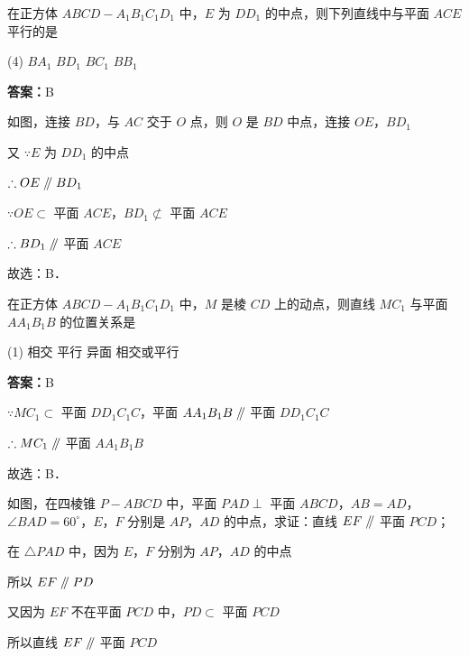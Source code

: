 \begin{example}[\bkstar{1}{5}]
在正方体 $ABCD-A_1B_1C_1D_1$ 中，$E$ 为 $DD_1$ 的中点，则下列直线中与平面 $ACE$ 平行的是
\begin{tasks}(4)
    \task $BA_1$
    \task $BD_1$
    \task $BC_1$
    \task $BB_1$
\end{tasks}
\end{example}
\begin{solution}
\textbf{答案：}B

如图，连接 $BD$，与 $AC$ 交于 $O$ 点，则 $O$ 是 $BD$ 中点，连接 $OE$，$BD_1$

又 $\because E$ 为 $DD_1$ 的中点

$\therefore OE\mathrel{/\mkern-5mu/} BD_1$

$\because OE\subset$ 平面 $ACE$，$BD_1\not\subset$ 平面 $ACE$

$\therefore BD_1\mathrel{/\mkern-5mu/}$ 平面 $ACE$

故选：B．
\end{solution}

\vspace{2em}

\begin{example}[\bkstar{1}{5}]
在正方体 $ABCD-A_1B_1C_1D_1$ 中，$M$ 是棱 $CD$ 上的动点，则直线 $MC_1$ 与平面 $AA_1B_1B$ 的位置关系是
\begin{tasks}(1)
    \task 相交
    \task 平行
    \task 异面
    \task 相交或平行
\end{tasks}
\end{example}
\begin{solution}
\textbf{答案：}B

$\because MC_1\subset$ 平面 $DD_1C_1C$，平面 $AA_1B_1B\mathrel{/\mkern-5mu/}$ 平面 $DD_1C_1C$

$\therefore MC_1\mathrel{/\mkern-5mu/}$ 平面 $AA_1B_1B$

故选：B．
\end{solution}

\vspace{2em}

\begin{example}[\bkstar{2}{5}]
如图，在四棱锥 $P-ABCD$ 中，平面 $PAD\perp$ 平面 $ABCD$，$AB=AD$，$\angle BAD=60^{\circ}$，$E$，$F$ 分别是 $AP$，$AD$ 的中点，求证：直线 $EF\mathrel{/\mkern-5mu/}$ 平面 $PCD$；
\end{example}
\begin{solution}
在 $\triangle PAD$ 中，因为 $E$，$F$ 分别为 $AP$，$AD$ 的中点

所以 $EF\mathrel{/\mkern-5mu/} PD$

又因为 $EF$ 不在平面 $PCD$ 中，$PD\subset$ 平面 $PCD$

所以直线 $EF\mathrel{/\mkern-5mu/}$ 平面 $PCD$ %
\end{solution}

